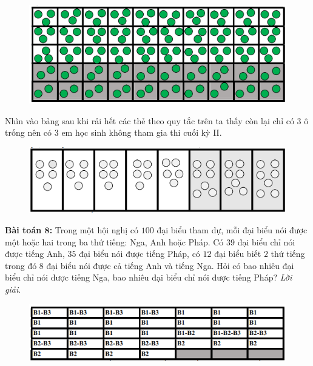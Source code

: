 \begin{multicols}{2}
	\begin{figure}[H]
		\vspace*{-5pt}
		\centering
		\captionsetup{labelformat= empty, justification=centering}
		\includegraphics[width= 1\linewidth]{6}
		\vspace*{-15pt}
	\end{figure}	
	Nhìn vào bảng sau khi rải hết các thẻ theo quy tắc trên ta thấy còn lại chỉ có $3$ ô trống nên có $3$ em học sinh không tham gia thi cuối kỳ II.
	\begin{figure}[H]
		\vspace*{-5pt}
		\centering
		\captionsetup{labelformat= empty, justification=centering}
		\includegraphics[width= 1\linewidth]{7}
		\vspace*{-15pt}
	\end{figure}
	\textbf{\color{diendantoanhoc}Bài toán $\pmb8$:} 
	\vskip 0.1cm
	Trong một hội nghị có $100$ đại biểu tham dự, mỗi đại biểu nói được một hoặc hai trong ba thứ tiếng: Nga, Anh hoặc Pháp. Có $39$ đại biểu chỉ nói được tiếng Anh, $35$ đại biểu nói được tiếng Pháp, có $12$ đại biểu biết $2$ thứ tiếng trong đó $8$ đại biểu nói được cả tiếng Anh và tiếng Nga. Hỏi có bao nhiêu đại biểu chỉ nói được tiếng Nga, bao nhiêu đại biểu chỉ nói được tiếng Pháp?
	\vskip 0.1cm
	\textit{Lời giải}.
	\begin{figure}[H]
		\vspace*{-5pt}
		\centering
		\captionsetup{labelformat= empty, justification=centering}
		\includegraphics[width= 1\linewidth]{8}

\end{figure}
\end{multicols}
